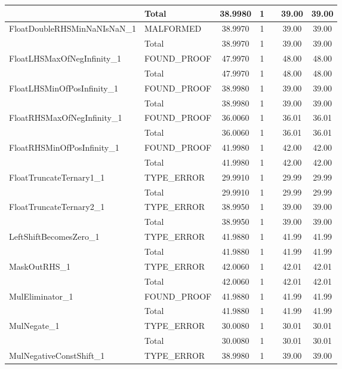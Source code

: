 \begin{appendices}
\begin{longtable}{L{0.25\textwidth} L{0.2\textwidth}  c  c  c  c  c }
    & Total & 38.9980 & 1 &  & 39.00 & 39.00 \\ \midrule 
    FloatDoubleRHSMinNaNIsNaN\_1 & MALFORMED & 38.9970 & 1 &  & 39.00 & 39.00 \\ \midrule 
    & Total & 38.9970 & 1 &  & 39.00 & 39.00 \\ \midrule 
    FloatLHSMaxOfNegInfinity\_1 & FOUND\_PROOF & 47.9970 & 1 &  & 48.00 & 48.00 \\ \midrule 
    & Total & 47.9970 & 1 &  & 48.00 & 48.00 \\ \midrule 
    FloatLHSMinOfPosInfinity\_1 & FOUND\_PROOF & 38.9980 & 1 &  & 39.00 & 39.00 \\ \midrule 
    & Total & 38.9980 & 1 &  & 39.00 & 39.00 \\ \midrule 
    FloatRHSMaxOfNegInfinity\_1 & FOUND\_PROOF & 36.0060 & 1 &  & 36.01 & 36.01 \\ \midrule 
    & Total & 36.0060 & 1 &  & 36.01 & 36.01 \\ \midrule 
    FloatRHSMinOfPosInfinity\_1 & FOUND\_PROOF & 41.9980 & 1 &  & 42.00 & 42.00 \\ \midrule 
    & Total & 41.9980 & 1 &  & 42.00 & 42.00 \\ \midrule 
    FloatTruncateTernary1\_1 & TYPE\_ERROR & 29.9910 & 1 &  & 29.99 & 29.99 \\ \midrule 
    & Total & 29.9910 & 1 &  & 29.99 & 29.99 \\ \midrule 
    FloatTruncateTernary2\_1 & TYPE\_ERROR & 38.9950 & 1 &  & 39.00 & 39.00 \\ \midrule 
    & Total & 38.9950 & 1 &  & 39.00 & 39.00 \\ \midrule 
    LeftShiftBecomesZero\_1 & TYPE\_ERROR & 41.9880 & 1 &  & 41.99 & 41.99 \\ \midrule 
    & Total & 41.9880 & 1 &  & 41.99 & 41.99 \\ \midrule 
    MaskOutRHS\_1 & TYPE\_ERROR & 42.0060 & 1 &  & 42.01 & 42.01 \\ \midrule 
    & Total & 42.0060 & 1 &  & 42.01 & 42.01 \\ \midrule 
    MulEliminator\_1 & FOUND\_PROOF & 41.9880 & 1 &  & 41.99 & 41.99 \\ \midrule 
    & Total & 41.9880 & 1 &  & 41.99 & 41.99 \\ \midrule 
    MulNegate\_1 & TYPE\_ERROR & 30.0080 & 1 &  & 30.01 & 30.01 \\ \midrule 
    & Total & 30.0080 & 1 &  & 30.01 & 30.01 \\ \midrule 
    MulNegativeConstShift\_1 & TYPE\_ERROR & 38.9980 & 1 &  & 39.00 & 39.00 \\ \midrule 

\end{longtable}
\end{appendices}
